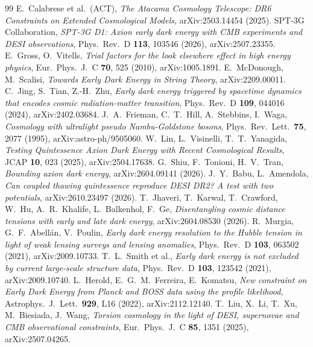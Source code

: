 \documentclass[11pt]{article}
\begin{document}
\begin{thebibliography}{99}
 E.~Calabrese et al.\ (ACT), \emph{The Atacama Cosmology Telescope: DR6
Constraints on Extended Cosmological Models}, arXiv:2503.14454 (2025).
 SPT-3G Collaboration, \emph{SPT-3G D1: Axion early dark energy with CMB experiments
and DESI observations}, Phys.\ Rev.\ D \textbf{113}, 103546 (2026), arXiv:2507.23355.
 E.~Gross, O.~Vitells, \emph{Trial factors for the look elsewhere effect in high energy
physics}, Eur.\ Phys.\ J.\ C \textbf{70}, 525 (2010), arXiv:1005.1891.
 E.~McDonough, M.~Scalisi, \emph{Towards Early Dark Energy in String Theory}, arXiv:2209.00011.
 C.~Jing, S.~Tian, Z.-H.~Zhu, \emph{Early dark energy triggered by spacetime dynamics that encodes
cosmic radiation-matter transition}, Phys.\ Rev.\ D \textbf{109}, 044016 (2024), arXiv:2402.03684.
 J.~A.~Frieman, C.~T.~Hill, A.~Stebbins, I.~Waga, \emph{Cosmology with ultralight pseudo
Nambu-Goldstone bosons}, Phys.\ Rev.\ Lett.\ \textbf{75}, 2077 (1995), arXiv:astro-ph/9505060.
 W.~Lin, L.~Visinelli, T.~T.~Yanagida, \emph{Testing Quintessence Axion Dark Energy with Recent
Cosmological Results}, JCAP \textbf{10}, 023 (2025), arXiv:2504.17638.
 G.~Shiu, F.~Tonioni, H.~V.~Tran, \emph{Bounding axion dark energy}, arXiv:2604.09141 (2026).
 J.~Y.~Babu, L.~Amendola, \emph{Can coupled thawing quintessence reproduce DESI DR2? A test with two
potentials}, arXiv:2610.23497 (2026).
 T.~Jhaveri, T.~Karwal, T.~Crawford, W.~Hu, A.~R.~Khalife, L.~Balkenhol, F.~Ge,
\emph{Disentangling cosmic distance tensions with early and late dark energy}, arXiv:2604.08530 (2026).
 R.~Murgia, G.~F.~Abell\'an, V.~Poulin, \emph{Early dark energy resolution to the Hubble tension
in light of weak lensing surveys and lensing anomalies}, Phys.\ Rev.\ D \textbf{103}, 063502 (2021), arXiv:2009.10733.
 T.~L.~Smith et al., \emph{Early dark energy is not excluded by current large-scale structure
data}, Phys.\ Rev.\ D \textbf{103}, 123542 (2021), arXiv:2009.10740.
 L.~Herold, E.~G.~M.~Ferreira, E.~Komatsu, \emph{New constraint on Early Dark Energy from Planck
and BOSS data using the profile likelihood}, Astrophys.\ J.\ Lett.\ \textbf{929}, L16 (2022), arXiv:2112.12140.
 T.~Liu, X.~Li, T.~Xu, M.~Biesiada, J.~Wang, \emph{Torsion cosmology in the light of DESI,
supernovae and CMB observational constraints}, Eur.\ Phys.\ J.\ C \textbf{85}, 1351 (2025), arXiv:2507.04265.

\end{thebibliography}
\end{document}
